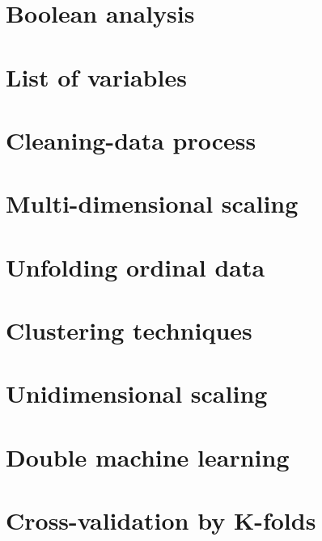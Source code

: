 \printbibliography[heading=subbibliography]

\begin{appendices}
	\renewcommand{\thesection}{Appendix \arabic{section}}

\small

\newpage
\section{Boolean analysis} \label{app:boolean}


\newpage
\section{List of variables} \label{app:variables}


\newpage
\section{Cleaning-data process} \label{app:cleaning}


\newpage
\section{Multi-dimensional scaling} \label{app:multiscale}


\newpage
\section{Unfolding ordinal data} \label{app:unfolding}


\newpage
\section{Clustering techniques} \label{app:clustering}


\newpage
\section{Unidimensional scaling} \label{app:uniscale}


\newpage
\section{Double machine learning} \label{app:dml}


\newpage
\section{Cross-validation by K-folds} \label{app:kfold}


\end{appendices}